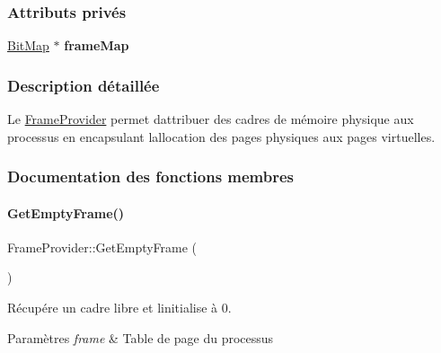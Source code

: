 \subsubsection*{Attributs privés}
\begin{DoxyCompactItemize}
\item 
\hypertarget{class_frame_provider_ae02e4f5520987c04d6ec66dc17aa9823}{}\label{class_frame_provider_ae02e4f5520987c04d6ec66dc17aa9823} 
\hyperlink{class_bit_map}{Bit\+Map} $\ast$ {\bfseries frame\+Map}
\end{DoxyCompactItemize}


\subsubsection{Description détaillée}
Le \hyperlink{class_frame_provider}{Frame\+Provider} permet d\textquotesingle{}attribuer des cadres de mémoire physique aux processus en encapsulant l\textquotesingle{}allocation des pages physiques aux pages virtuelles. 

\subsubsection{Documentation des fonctions membres}
\hypertarget{class_frame_provider_a24e2dbd45651d75f94d0f6fb3920b70b}{}\label{class_frame_provider_a24e2dbd45651d75f94d0f6fb3920b70b} 
\paragraph{\texorpdfstring{Get\+Empty\+Frame()}{GetEmptyFrame()}}
{\footnotesize\ttfamily Frame\+Provider\+::\+Get\+Empty\+Frame (\begin{DoxyParamCaption}{ }\end{DoxyParamCaption})}



Récupére un cadre libre et l\textquotesingle{}initialise à 0. 


\begin{DoxyParams}{Paramètres}
{\em frame} & Table de page du processus \\
\hline
\end{DoxyParams}
\hypertarget{class_frame_provider_a42f08056453908df534cfc3c086d71a2}{}\label{class_frame_provider_a42f08056453908df534cfc3c086d71a2} 
